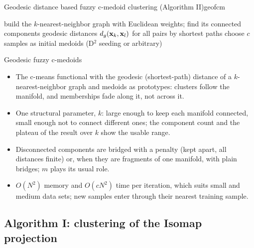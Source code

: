 \begin{algobox}{Geodesic distance based fuzzy c-medoid clustering (Algorithm II)}{geofcm}
\begin{algorithm}[H]
build the $k$-nearest-neighbor graph with Euclidean weights; find its connected components\;
geodesic distances $d_g(\mathbf{x}_k,\mathbf{x}_l)$ for all pairs by shortest paths\;
choose $c$ samples as initial medoids (D$^2$ seeding or arbitrary)\;
\end{algorithm}
\end{algobox}
\begin{summarybox}{Geodesic fuzzy c-medoids}
\begin{itemize}
  \item The c-means functional with the geodesic (shortest-path) distance of a $k$-nearest-neighbor graph and medoids as prototypes: clusters follow the manifold, and memberships fade along it, not across it.
  \item One structural parameter, $k$: large enough to keep each manifold connected, small enough not to connect different ones; the component count and the plateau of the result over $k$ show the usable range.
  \item Disconnected components are bridged with a penalty (kept apart, all distances finite) or, when they are fragments of one manifold, with plain bridges; $m$ plays its usual role.
  \item $O(N^2)$ memory and $O(cN^2)$ time per iteration, which suits small and medium data sets; new samples enter through their nearest training sample.
\end{itemize}
\end{summarybox}

\subsection{Algorithm I: clustering of the Isomap projection}\label{sec:graph:isomap}

